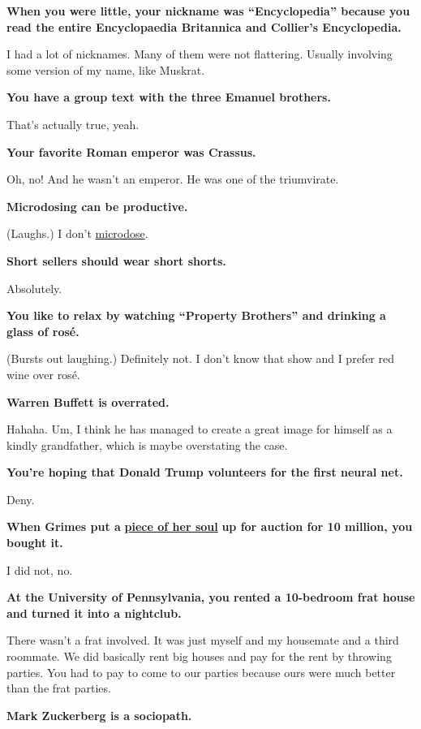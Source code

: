 \textbf{When you were little, your nickname was ``Encyclopedia'' because
you read the entire Encyclopaedia Britannica and Collier's
Encyclopedia.}

I had a lot of nicknames. Many of them were not flattering. Usually
involving some version of my name, like Muskrat.

\textbf{You have a group text with the three Emanuel brothers.}

That's actually true, yeah.

\textbf{Your favorite Roman emperor was Crassus.}

Oh, no! And he wasn't an emperor. He was one of the triumvirate.

\textbf{Microdosing can be productive.}

(Laughs.) I don't
\href{https://www.nytimes3xbfgragh.onion/2018/08/23/opinion/elon-musk-burning-man-drugs-lsd.html}{microdose}.

\textbf{Short sellers should wear short shorts.}

Absolutely.

\textbf{You like to relax by watching ``Property Brothers'' and drinking
a glass of rosé.}

(Bursts out laughing.) Definitely not. I don't know that show and I
prefer red wine over rosé.

\textbf{Warren Buffett is overrated.}

Hahaha. Um, I think he has managed to create a great image for himself
as a kindly grandfather, which is maybe overstating the case.

\textbf{You're hoping that Donald Trump volunteers for the first neural
net.}

Deny.

\textbf{When Grimes put a}
\textbf{\href{https://www.bloomberg.com/news/articles/2020-05-28/grimes-art-project-pop-star-sells-a-piece-of-her-soul}{piece
of her soul}} \textbf{up for auction for 10 million, you bought it.}

I did not, no.

\textbf{At the University of Pennsylvania, you rented a 10-bedroom frat
house and turned it into a nightclub.}

There wasn't a frat involved. It was just myself and my housemate and a
third roommate. We did basically rent big houses and pay for the rent by
throwing parties. You had to pay to come to our parties because ours
were much better than the frat parties.

\textbf{Mark Zuckerberg is a sociopath.}

